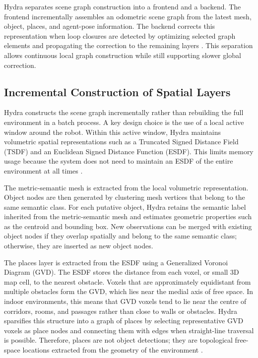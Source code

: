 {{{Hydra separates scene graph construction into a frontend and a backend. The frontend incrementally assembles an odometric scene graph from the latest mesh, object, places, and agent-pose information. The backend corrects this representation when loop closures are detected by optimizing selected graph elements and propagating the correction to the remaining layers \cite{hughes2022hydra}. This separation allows continuous local graph construction while still supporting slower global correction.

}

\subsection{Incremental Construction of Spatial Layers}
\label{subsec:hydra_incremental}

{\small

Hydra constructs the scene graph incrementally rather than rebuilding the full environment in a batch process. A key design choice is the use of a local active window around the robot. Within this active window, Hydra maintains volumetric spatial representations such as a Truncated Signed Distance Field (TSDF) and an Euclidean Signed Distance Function (ESDF). This limits memory usage because the system does not need to maintain an ESDF of the entire environment at all times \cite{hughes2022hydra}.

The metric-semantic mesh is extracted from the local volumetric representation. Object nodes are then generated by clustering mesh vertices that belong to the same semantic class. For each putative object, Hydra retains the semantic label inherited from the metric-semantic mesh and estimates geometric properties such as the centroid and bounding box. New observations can be merged with existing object nodes if they overlap spatially and belong to the same semantic class; otherwise, they are inserted as new object nodes.

The places layer is extracted from the ESDF using a Generalized Voronoi Diagram (GVD). The ESDF stores the distance from each voxel, or small 3D map cell, to the nearest obstacle. Voxels that are approximately equidistant from multiple obstacles form the GVD, which lies near the medial axis of free space. In indoor environments, this means that GVD voxels tend to lie near the centre of corridors, rooms, and passages rather than close to walls or obstacles. Hydra sparsifies this structure into a graph of places by selecting representative GVD voxels as place nodes and connecting them with edges when straight-line traversal is possible. Therefore, places are not object detections; they are topological free-space locations extracted from the geometry of the environment \cite{hughes2022hydra}.

}}}
